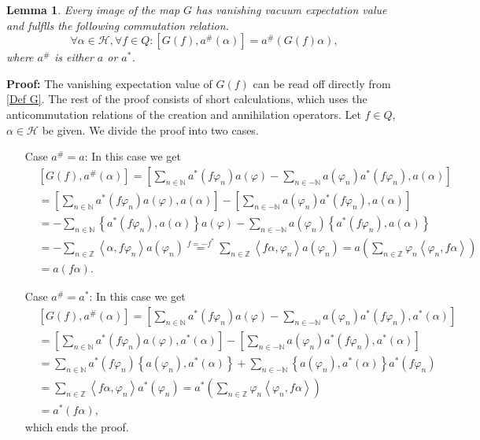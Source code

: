 \documentclass[oneside,reqno,12pt]{amsart}
\newtheorem{Lemma}[Def]{Lemma}
\begin{document}
\begin{Lemma}
Every image of the map \(G\) has vanishing vacuum expectation value and fulflls the following commutation relation. 
\begin{equation}\label{Commutation G}
\forall \alpha \in \mathcal{H},\forall f\in Q: \left[ G(f), a^{\#} (\alpha)\right]=a^{\#} \left( G(f)\alpha\right)
,\end{equation}
where \(a^{\#}\) is either \(a\) or \(a^*\).
\end{Lemma}
{\bf Proof:} The vanishing expectation value of \(G(f)\) can be read off directly from \eqref{Def G}. The rest of the proof consists of short calculations, which uses the anticommutation relations of the creation and annihilation operators. Let \(f\in Q\),\(\alpha\in \mathcal{H}\) be given. We divide the proof into two cases.
\begin{enumerate}
\item[Case \(a^\#=a\):] In this case we get
\begin{align*}
&\left[ G(f), a^{\#} (\alpha)\right]= \left[ \sum_{n\in\mathbb{N}}a^*(f \varphi_n) a(\varphi) - \sum_{n\in -\mathbb{N}} a(\varphi_n) a^*(f \varphi_n), a(\alpha)\right]\\
&=\left[ \sum_{n\in\mathbb{N}}a^*(f \varphi_n) a(\varphi), a(\alpha)\right] - \left[\sum_{n\in -\mathbb{N}} a(\varphi_n) a^*(f \varphi_n), a(\alpha)\right]\\
&= -\sum_{n\in\mathbb{N}} \left\{ a^*(f \varphi_n) , a(\alpha)\right\}a(\varphi)
-\sum_{n\in -\mathbb{N}}  a(\varphi_n) \left\{  a^*(f \varphi_n), a(\alpha)\right\}\\
&= -\sum_{n\in\mathbb{Z}} \left< \alpha, f \varphi_n\right> a(\varphi_n)
\stackrel{f=-f^*}{=}\sum_{n\in\mathbb{Z}} \left< f \alpha, \varphi_n\right> a(\varphi_n)= a\left( \sum_{n\in\mathbb{Z}} \varphi_n \left<\varphi_n,f \alpha \right> \right)\\
&= a(f\alpha).
\end{align*}

\item[Case \(a^\#=a^*\):] In this case we get 
\begin{align*}
&\left[ G(f), a^{\#} (\alpha)\right]
= \left[ \sum_{n\in\mathbb{N}}a^*(f \varphi_n) a(\varphi) - \sum_{n\in -\mathbb{N}} a(\varphi_n) a^*(f \varphi_n), a^*(\alpha)\right]\\
&=\left[ \sum_{n\in\mathbb{N}}a^*(f \varphi_n) a(\varphi), a^*(\alpha)\right] - \left[\sum_{n\in -\mathbb{N}} a(\varphi_n) a^*(f \varphi_n), a^*(\alpha)\right]\\
&= \sum_{n\in\mathbb{N}} a^*(f \varphi_n) \left\{ a( \varphi_n) , a^*(\alpha)\right\}
+\sum_{n\in -\mathbb{N}}   \left\{  a( \varphi_n), a^*(\alpha)\right\}a^*(f \varphi_n)\\
&= \sum_{n\in\mathbb{Z}} \left< f\alpha,  \varphi_n\right> a^*(\varphi_n)
= a^*\left( \sum_{n\in\mathbb{Z}} \varphi_n \left<\varphi_n,f \alpha \right> \right)\\
&= a^*(f\alpha),
\end{align*}
which ends the proof.
\end{enumerate}
\end{document}
